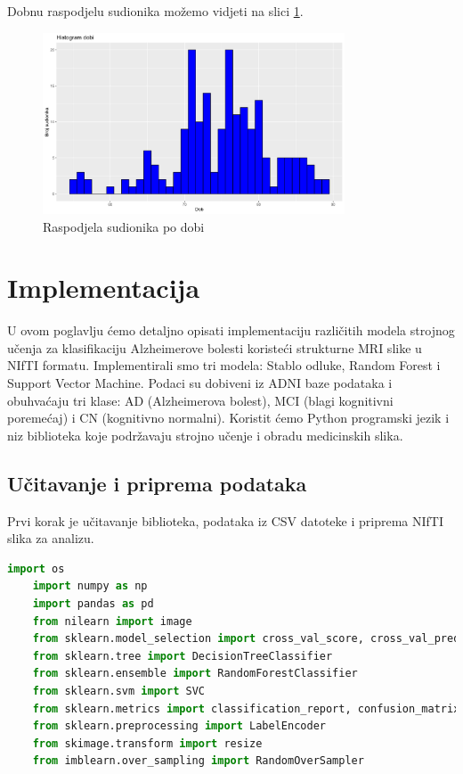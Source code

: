\documentclass[zavrsnirad]{fer}
\begin{document}
Dobnu raspodjelu sudionika možemo vidjeti na slici \ref{fig:dob}.
\begin{figure}[h]
	\centering
	\includegraphics[width=0.8\textwidth]{Figures/histogram_dobi.png}
	\caption{Raspodjela sudionika po dobi}
	\label{fig:dob}
\end{figure}


\section{Implementacija}
U ovom poglavlju ćemo detaljno opisati implementaciju različitih modela strojnog učenja za klasifikaciju Alzheimerove bolesti koristeći strukturne MRI slike u NIfTI formatu. Implementirali smo tri modela: Stablo odluke, Random Forest i Support Vector Machine. Podaci su dobiveni iz ADNI baze podataka i obuhvaćaju tri klase: AD (Alzheimerova bolest), MCI (blagi kognitivni poremećaj) i CN (kognitivno normalni). Koristit ćemo Python programski jezik i niz biblioteka koje podržavaju strojno učenje i obradu medicinskih slika.

\subsection{Učitavanje i priprema podataka}
Prvi korak je učitavanje biblioteka, podataka iz CSV datoteke i priprema NIfTI slika za analizu.

\begin{lstlisting}[language=Python, caption={Učitavanje Python biblioteka}]
	import os
	import numpy as np
	import pandas as pd
	from nilearn import image
	from sklearn.model_selection import cross_val_score, cross_val_predict
	from sklearn.tree import DecisionTreeClassifier
	from sklearn.ensemble import RandomForestClassifier
	from sklearn.svm import SVC
	from sklearn.metrics import classification_report, confusion_matrix
	from sklearn.preprocessing import LabelEncoder
	from skimage.transform import resize
	from imblearn.over_sampling import RandomOverSampler
\end{lstlisting}
\end{document}
